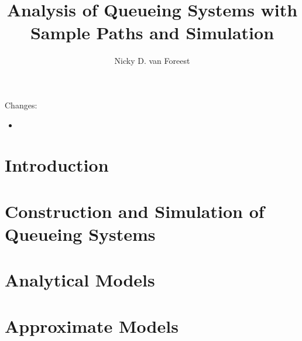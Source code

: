 \author{Nicky D. van  Foreest}
\title{Analysis of Queueing Systems with  Sample Paths and Simulation }


\maketitle

Changes:
\begin{itemize}
\item
\end{itemize}

\tableofcontents

\chapter*{Introduction}\label{sec:introduction}





\chapter{Construction and Simulation of Queueing Systems}

\label{cha:single-stat-queu}








\chapter{Analytical Models}
\label{cha:analytical-models}
















% 
%


\chapter{Approximate Models}
\label{cha:approximate-models}




%


